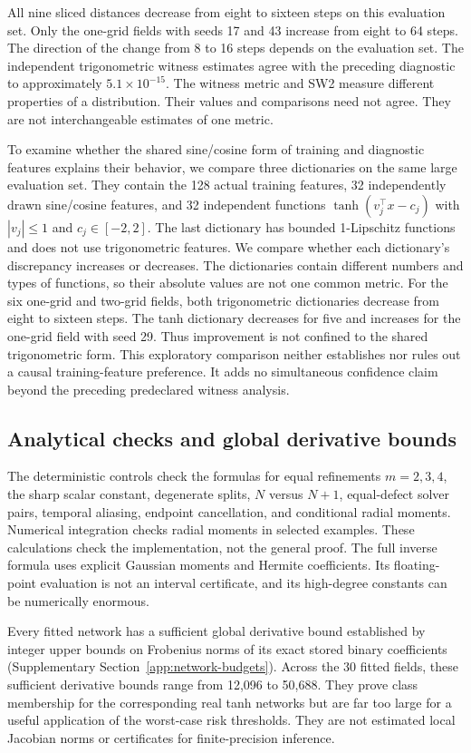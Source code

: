 All nine sliced distances decrease from eight to sixteen steps on this
evaluation set. Only the one-grid fields with seeds 17 and 43 increase from eight to 64 steps.
The direction of the change from 8 to 16 steps depends on the
evaluation set. The independent trigonometric
witness estimates agree with the preceding diagnostic to approximately
$5.1\times10^{-15}$. The witness metric and SW2 measure different properties of a distribution.
Their values and comparisons need not agree. They are not interchangeable
estimates of one metric.

To examine whether the shared sine/cosine form of training and diagnostic
features explains their behavior, we compare three dictionaries on the
same large evaluation set. They contain the 128 actual training features, 32
independently drawn sine/cosine features, and 32 independent functions
$\tanh(v_j^\top x-c_j)$ with $|v_j|\le1$ and $c_j\in[-2,2]$.
The last dictionary has bounded 1-Lipschitz functions and does not use
trigonometric features. We compare whether each dictionary's discrepancy increases or decreases.
The dictionaries contain different numbers and types of functions, so
their absolute values are not one common metric. For the six one-grid and two-grid fields,
both trigonometric dictionaries decrease from eight to sixteen steps.
The tanh dictionary decreases for five and increases for the one-grid field with
seed 29. Thus improvement is not confined to the shared trigonometric
form. This exploratory comparison neither establishes nor rules out a
causal training-feature preference. It adds no simultaneous confidence
claim beyond the preceding predeclared witness analysis.

\subsection{Analytical checks and global derivative bounds}
The deterministic controls check the formulas for equal refinements
$m=2,3,4$, the sharp scalar constant, degenerate splits, $N$ versus $N+1$,
equal-defect solver pairs, temporal aliasing, endpoint cancellation, and
conditional radial moments. Numerical integration checks radial moments
in selected examples. These calculations check the implementation, not the
general proof. The full inverse formula uses explicit Gaussian moments
and Hermite coefficients. Its floating-point evaluation is not an interval
certificate, and its high-degree constants can be numerically enormous.

Every fitted network has a sufficient global derivative bound established by
integer upper bounds on Frobenius norms of its exact stored binary
coefficients (Supplementary Section~\ref{app:network-budgets}). Across the 30 fitted fields,
these sufficient derivative bounds range from 12,096 to 50,688. They prove class
membership for the corresponding real tanh networks but are far too large
for a useful application of the worst-case risk thresholds. They are not
estimated local Jacobian norms or certificates for finite-precision inference.

